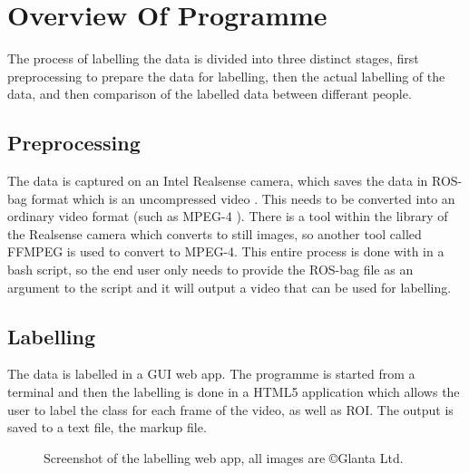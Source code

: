 \section{Overview Of Programme}
The process of labelling the data is divided into three distinct stages, first preprocessing to prepare the data for labelling, then the actual labelling of the data, and then comparison of the labelled data between differant people.
    \subsection{Preprocessing}
    The data is captured on an Intel Realsense camera, which saves the data in ROS-bag format which is an uncompressed video \cite{intelrosbag}. This needs to be converted into an ordinary video format (such as MPEG-4 \cite{wiegand2003overview}). There is a tool within the library of the Realsense camera which converts to still images, so another tool called FFMPEG \cite{ffmpeg} is used to convert to MPEG-4. This entire process is done with in a bash script, so the end user only needs to provide the ROS-bag file as an argument to the script and it will output a video that can be used for labelling.
    \subsection{Labelling}
    The data is labelled in a GUI web app. The programme is started from a terminal and then the labelling is done in a HTML5 application which allows the user to label the class for each frame of the video, as well as ROI. The output is saved to a text file, the markup file.

    \begin{figure}[h]
        \centering
        \caption{Screenshot of the labelling web app, all images are \copyright \space Glanta Ltd.}
        \label{fig:markupscreenshot}
    \end{figure}

